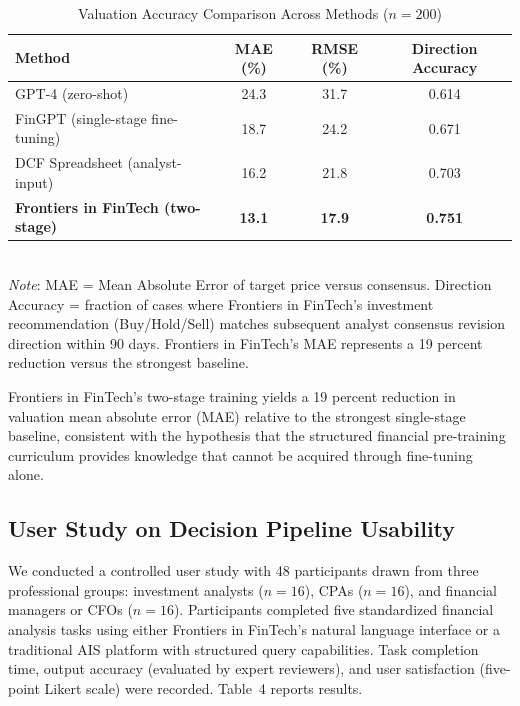 \documentclass[12pt,letterpaper]{article}
\begin{document}
\begin{table}[H]
  \singlespacing
  \centering
  \caption{Valuation Accuracy Comparison Across Methods ($n = 200$)}
  \label{tab:valuation_accuracy}
  \begin{tabular}{@{}lccc@{}}
    \toprule
    \textbf{Method} & \textbf{MAE (\%)} & \textbf{RMSE (\%)}
      & \textbf{Direction Accuracy} \\
    \midrule
    GPT-4 (zero-shot)                   & 24.3 & 31.7 & 0.614 \\
    FinGPT (single-stage fine-tuning)   & 18.7 & 24.2 & 0.671 \\
    DCF Spreadsheet (analyst-input)     & 16.2 & 21.8 & 0.703 \\
    \textbf{Frontiers in FinTech (two-stage)}      & \textbf{13.1}
      & \textbf{17.9} & \textbf{0.751} \\
    \bottomrule
  \end{tabular}
  \vspace{4pt}\\
  \footnotesize\textit{Note}: MAE = Mean Absolute Error of target price versus
  consensus. Direction Accuracy = fraction of cases where Frontiers in FinTech's
  investment recommendation (Buy/Hold/Sell) matches subsequent analyst
  consensus revision direction within 90 days. Frontiers in FinTech's MAE
  represents a 19 percent reduction versus the strongest baseline.
\end{table}

Frontiers in FinTech's two-stage training yields a 19 percent reduction in valuation
mean absolute error (MAE) relative to the strongest single-stage
baseline, consistent with the hypothesis that the structured financial
pre-training curriculum provides knowledge that cannot be acquired
through fine-tuning alone.

\subsection{User Study on Decision Pipeline Usability}

We conducted a controlled user study with 48 participants drawn from
three professional groups: investment analysts ($n = 16$), CPAs
($n = 16$), and financial managers or CFOs ($n = 16$).
Participants completed five standardized financial analysis tasks using
either Frontiers in FinTech's natural language interface or a traditional AIS
platform with structured query capabilities.
Task completion time, output accuracy (evaluated by expert reviewers),
and user satisfaction (five-point Likert scale) were recorded.
Table~4 reports results.
\end{document}
